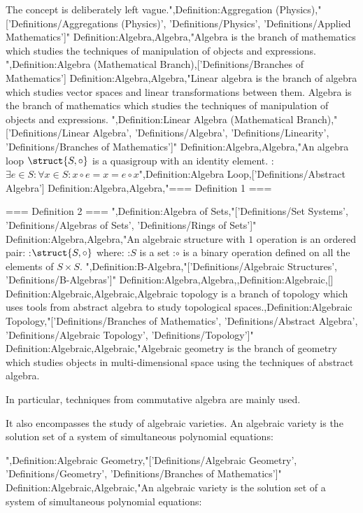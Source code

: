 The concept is deliberately left vague.",Definition:Aggregation (Physics),"['Definitions/Aggregations (Physics)', 'Definitions/Physics', 'Definitions/Applied Mathematics']"
Definition:Algebra,Algebra,"Algebra is the branch of mathematics which studies the techniques of manipulation of objects and expressions.
",Definition:Algebra (Mathematical Branch),['Definitions/Branches of Mathematics']
Definition:Algebra,Algebra,"Linear algebra is the branch of algebra which studies vector spaces and linear transformations between them.
Algebra is the branch of mathematics which studies the techniques of manipulation of objects and expressions.
",Definition:Linear Algebra (Mathematical Branch),"['Definitions/Linear Algebra', 'Definitions/Algebra', 'Definitions/Linearity', 'Definitions/Branches of Mathematics']"
Definition:Algebra,Algebra,"An algebra loop $\struct {S, \circ}$ is a quasigroup with an identity element.
:$\exists e \in S: \forall x \in S: x \circ e = x = e \circ x$",Definition:Algebra Loop,['Definitions/Abstract Algebra']
Definition:Algebra,Algebra,"=== Definition 1 ===



=== Definition 2 ===
",Definition:Algebra of Sets,"['Definitions/Set Systems', 'Definitions/Algebras of Sets', 'Definitions/Rings of Sets']"
Definition:Algebra,Algebra,"An algebraic structure with $1$ operation is an ordered pair:
:$\struct {S, \circ}$
where:
:$S$ is a set
:$\circ$ is a binary operation defined on all the elements of $S \times S$.
",Definition:B-Algebra,"['Definitions/Algebraic Structures', 'Definitions/B-Algebras']"
Definition:Algebra,Algebra,,Definition:Algebraic,[]
Definition:Algebraic,Algebraic,Algebraic topology is a branch of topology which uses tools from abstract algebra to study topological spaces.,Definition:Algebraic Topology,"['Definitions/Branches of Mathematics', 'Definitions/Abstract Algebra', 'Definitions/Algebraic Topology', 'Definitions/Topology']"
Definition:Algebraic,Algebraic,"Algebraic geometry is the branch of geometry which studies objects in multi-dimensional space using the techniques of abstract algebra.

In particular, techniques from commutative algebra are mainly used.

It also encompasses the study of algebraic varieties.
An algebraic variety is the solution set of a system of simultaneous polynomial equations:







",Definition:Algebraic Geometry,"['Definitions/Algebraic Geometry', 'Definitions/Geometry', 'Definitions/Branches of Mathematics']"
Definition:Algebraic,Algebraic,"An algebraic variety is the solution set of a system of simultaneous polynomial equations:






